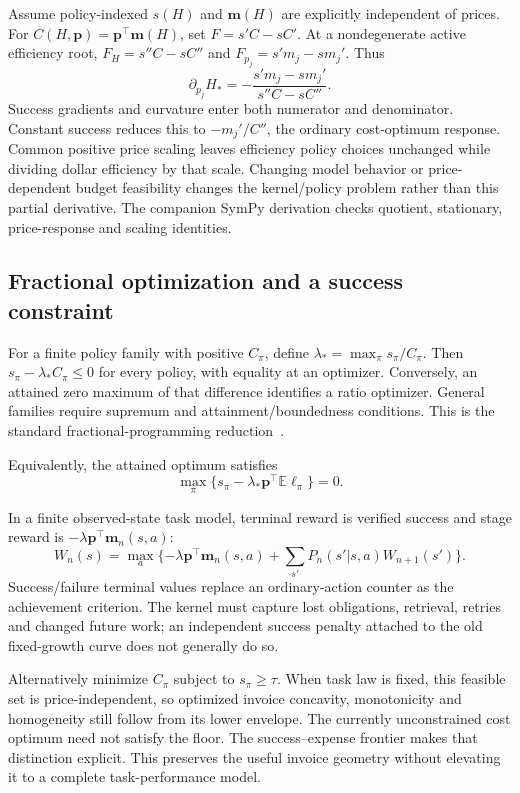\documentclass[sigconf,screen,nonacm]{acmart}
\newcommand{\E}{\mathbb{E}}
\newcommand{\pp}{\boldsymbol{p}}
\newcommand{\Mvec}{\boldsymbol{m}}
\begin{document}
Assume policy-indexed $s(H)$ and $\Mvec(H)$ are explicitly independent
of prices. For $C(H,\pp)=\pp^\top\Mvec(H)$, set $F=s'C-sC'$.
At a nondegenerate active efficiency root, $F_H=s''C-sC''$ and
$F_{p_j}=s'm_j-sm_j'$. Thus
\begin{equation}
\partial_{p_j}H_*=-\frac{s'm_j-sm_j'}{s''C-sC''}.
\label{eq:efficiency-price-response}
\end{equation}
Success gradients and curvature enter both numerator and denominator.
Constant success reduces this to $-m_j'/C''$, the ordinary cost-optimum
response. Common positive price scaling leaves efficiency policy choices
unchanged while dividing dollar efficiency by that scale. Changing model
behavior or price-dependent budget feasibility changes the kernel/policy
problem rather than this partial derivative. The companion SymPy
derivation checks quotient, stationary, price-response and scaling identities.

\subsection{Fractional optimization and a success constraint}
For a finite policy family with positive $C_\pi$, define
$\lambda_* = \max_\pi s_\pi/C_\pi$. Then
$s_\pi-\lambda_*C_\pi\le0$ for every policy, with equality at an
optimizer. Conversely, an attained zero maximum of that difference
identifies a ratio optimizer. General families require supremum and
attainment/boundedness conditions. This is the standard
fractional-programming reduction~\cite{dinkelbach}.

Equivalently, the attained optimum satisfies
\begin{equation}
\max_\pi\{s_\pi-\lambda_*\pp^\top\E\boldsymbol\ell_\pi\}=0.
\label{eq:task-fractional}
\end{equation}

In a finite observed-state task model, terminal reward is verified success
and stage reward is $-\lambda\pp^\top\Mvec_n(s,a)$:
\begin{equation}
W_n(s)=\max_a\{-\lambda\pp^\top\Mvec_n(s,a)
+\sum_{s'}P_n(s'|s,a)W_{n+1}(s')\}.
\end{equation}
Success/failure terminal values replace an ordinary-action counter as the
achievement criterion. The kernel must capture lost obligations,
retrieval, retries and changed future work; an independent success
penalty attached to the old fixed-growth curve does not generally do so.

Alternatively minimize $C_\pi$ subject to $s_\pi\ge\tau$. When task
law is fixed, this feasible set is price-independent, so optimized
invoice concavity, monotonicity and homogeneity still follow from its
lower envelope. The currently unconstrained cost optimum need not satisfy
the floor. The success--expense frontier makes that distinction explicit.
This preserves the useful invoice geometry without elevating it to a
complete task-performance model.
\end{document}
